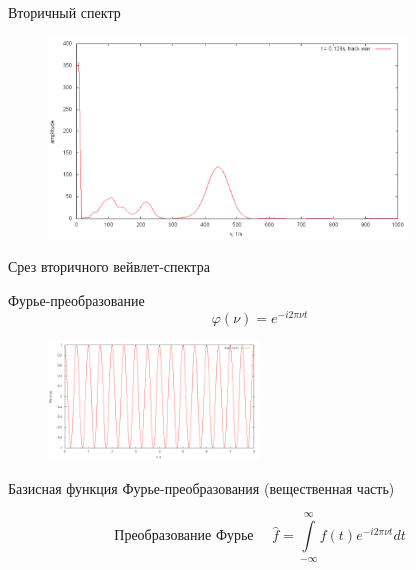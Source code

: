 \documentclass[11pt,slides,aspectratio=43]{beamer}%
\begin{document}
    \begin{frame}{Вторичный спектр}
        \begin{figure}[h!]
            \begin{center}
                \includegraphics[width = 0.85\textwidth]{secondSpectrum.png}
            \end{center}
        \end{figure}
        \begin{center}
           Срез вторичного вейвлет-спектра
        \end{center}
    \end{frame}

    \begin{frame}{Фурье-преобразование}
        $$
        \varphi(\nu) = e^{-i 2 \pi \nu t}
        $$
        \begin{figure}[h!]
            \begin{center}
                \includegraphics[width = 0.5\textwidth]{exp.png}
            \end{center}
        \end{figure}
        \begin{center}
           Базисная функция Фурье-преобразования (вещественная часть)
        \end{center}
        $$
        \mbox{Преобразование Фурье ~~~}\widehat{f} = \int\limits_{-\infty}^{\infty} f(t) e^{-i 2 \pi \nu t} dt
        $$
    \end{frame}
\end{document}
